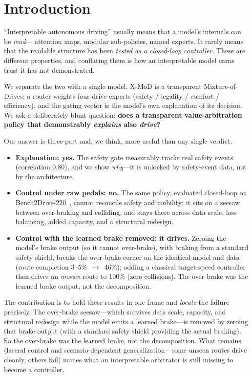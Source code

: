 \documentclass[10pt]{article}
\begin{document}
\section{Introduction}
``Interpretable autonomous driving'' usually means that a model's internals can be \emph{read}---
attention maps, modular sub-policies, named experts. It rarely means that the readable structure has
been \emph{tested as a closed-loop controller}. These are different properties, and conflating them is
how an interpretable model earns trust it has not demonstrated.

We separate the two with a single model. X-MoD is a transparent Mixture-of-Drives: a router weights
four drive-experts (safety / legality / comfort / efficiency), and the gating vector is the model's
own explanation of its decision. We ask a deliberately blunt question: \textbf{does a transparent
value-arbitration policy that demonstrably \emph{explains} also \emph{drive}?}

Our answer is three-part and, we think, more useful than any single verdict:
\begin{itemize}[leftmargin=1.4em,itemsep=2pt]
  \item \textbf{Explanation: yes.} The safety gate measurably tracks real safety events (correlation
  0.80), and we show \emph{why}---it is unlocked by safety-event data, not by the architecture.
  \item \textbf{Control under raw pedals: no.} The same policy, evaluated closed-loop on
  Bench2Drive-220~\cite{bench2drive}, cannot reconcile safety and mobility; it sits on a seesaw
  between over-braking and colliding, and stays there across data scale, loss balancing, added
  capacity, and a structural redesign.
  \item \textbf{Control with the learned brake removed: it drives.} Zeroing the model's brake
  output (so it cannot over-brake), with braking from a standard safety shield, breaks the over-brake
  corner on the identical model and data (route completion 3--5\%~$\rightarrow$~46\%); adding a
  classical target-speed controller then drives an \emph{unseen} route to 100\% (zero collisions). The
  over-brake was the learned brake output, not the decomposition.
\end{itemize}

The contribution is to hold these results in one frame and \emph{locate} the failure precisely. The
over-brake seesaw---which survives data scale, capacity, and structural redesign while the model emits
a learned brake---is removed by zeroing that brake output (with a standard safety shield providing the
actual braking). So the over-brake was the learned brake, not the decomposition. What remains
(lateral control and scenario-dependent generalization---some unseen routes drive cleanly, others
fail) names what an interpretable arbitrator is still missing to become a controller.
\end{document}
